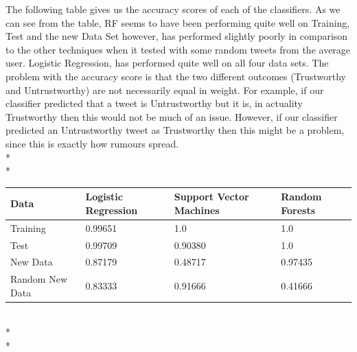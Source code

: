 \newpage
\noindent
The following table gives us the accuracy scores of each of the classifiers. As we can see from the table, RF seems to have been performing quite well on Training, Test and the new Data Set however, has performed slightly poorly in comparison to the other techniques when it tested with some random tweets from the average user. Logistic Regression, has performed quite well on all four data sets. The problem with the accuracy score is that the two different outcomes (Trustworthy and Untrustworthy) are not necessarily equal in weight. For example, if our classifier predicted that a tweet is Untrustworthy but it is, in actuality Trustworthy then this would not be much of an issue. However, if our classifier predicted an Untrustworthy tweet as Trustworthy then this might be a problem, since this is exactly how rumours spread.  \\*\\*
\begin{minipage}{\linewidth}
\centering
{} \label{tab:title} 
\begin{tabular}[t]{ C{1.4in} *3{C{1.4in}}}\toprule[1.5pt]
\bf Data & \bf Logistic Regression & \bf Support Vector Machines & \bf Random Forests \\\midrule
Training        &  0.99651  & 1.0 & 1.0\\
Test        &  0.99709     & 0.90380 & 1.0 \\
New Data        &  0.87179   & 0.48717  & 0.97435 \\
Random New Data & 0.83333 & 0.91666 & 0.41666 \\ 
\bottomrule[1.25pt]
\end {tabular}\par
\bigskip
\end{minipage}\\*\\*
\noindent
